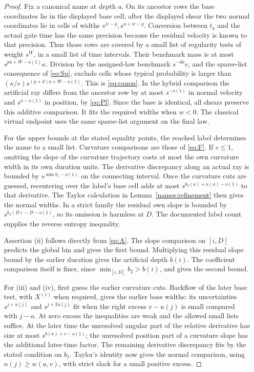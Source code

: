 \begin{proof}
Fix a canonical name at depth \(a\). On its ancestor rows the base
coordinates lie in the displayed base cell; after the displayed shear
the two normal coordinates lie in cells of widths
\(s^{w-g},s^{a+w-g}\). Conversion between \(t_a\) and the actual
gate time has the same precision because the residual velocity is
known to that precision. Thus those rows are covered by a small list
of regularity tests of weight \(s^W\), in a small list of time
intervals. Their benchmark mass is at most
\(s^{pa+W-o(1)}\kappa\). Division by the assigned-law benchmark
\(s^{-da}e\), and the sparse-list consequence of \eqref{eq:Sp},
exclude cells whose typical probability is larger than
\((\kappa/e)s^{(p+d)a+W-o(1)}\). This is \eqref{eq:canon}.
In the hybrid comparison the artificial ray differs from the ancestor
row by at most \(s^{-o(1)}\) in normal velocity and
\(s^{a-o(1)}\) in position, by \eqref{eq:Pl}. Since the base is
identical, all shears preserve this additive comparison. It fits the
required widths when \(w<0\). The classical virtual endpoint uses
the same sparse-list argument on the final law.

For the upper bounds at the stated equality points, the reached
label determines the name to a small list. Curvature comparisons are
those of \eqref{eq:F}. If \(c\leq1\), omitting the slope of the
curvature trajectory costs at most the own curvature width in its
own duration units. The derivative discrepancy along an actual ray
is bounded by \(s^{\min b_1-o(1)}\) on the connecting interval.
Once the curvature cuts are guessed, recentering over the label's
base cell adds at most \(s^{b_2(a)+u(a)-o(1)}\) to that derivative.
The Taylor calculation in Lemma~\ref{names:refinement} then gives the
normal widths. In a strict family the residual own slope is bounded
by \(s^{b_2(D)-D-o(1)}\), so its omission is harmless at \(D\).
The documented label count supplies the reverse entropy inequality.

Assertion (ii) follows directly from \eqref{eq:A}. The slope
comparison on \([i,D]\) predicts the global bin and gives the first
bound. Multiplying this residual slope bound by the earlier duration
gives the artificial depth \(b(i)\). The coefficient comparison
itself is finer, since \(\min_{[i,D]}b_2>b(i)\), and gives the
second bound.

For (iii) and (iv), first guess the earlier curvature cuts. Backflow
of the later base test, with \(X^{(v)}\) when required, gives the
earlier base widths: its uncertainties \(s^{j+u(j)}\) and
\(s^{j+2u(j)}\) fit when the right excess \(v-u(j)\) is small
compared with \(j-a\). At zero excess the inequalities are weak
and the allowed small lists suffice. At the later time the
unresolved angular part of the relative derivative has size at most
\(s^{b(a)+v-o(1)}\); the unresolved position part of a curvature
slope has the additional later-time factor. The remaining derivative
discrepancy fits by the stated condition on \(b_1\). Taylor's
identity now gives the normal comparison, using
\(n(j)\geq w(a,v)\), with strict slack for a small positive excess.


\end{proof}
